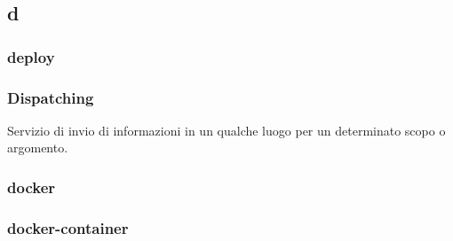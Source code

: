 \subsection*{\textbf{\hfill \Huge{d} \hfill}} 
\subsubsection*{deploy}

\subsubsection*{Dispatching}
Servizio di invio di informazioni in un qualche luogo per un determinato scopo o argomento.
\subsubsection*{docker}

\subsubsection*{docker-container}

